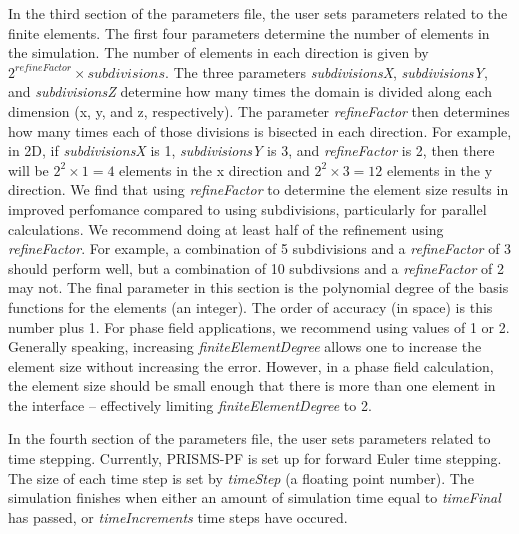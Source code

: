 \documentclass[10pt]{article} %
\begin{document}
In the third section of the parameters file, the user sets parameters related to the finite elements. The first four parameters determine the number of elements in the simulation. The number of elements in each direction is given by $2^{refineFactor} \times subdivisions$. The three parameters \emph{subdivisionsX}, \emph{subdivisionsY}, and \emph{subdivisionsZ} determine how many times the domain is divided along each dimension (x, y, and z, respectively). The parameter \emph{refineFactor} then determines how many times each of those divisions is bisected in each direction. For example, in 2D, if \emph{subdivisionsX} is 1, \emph{subdivisionsY} is 3, and \emph{refineFactor} is 2, then there will be $2^2 \times 1 =4$ elements in the x direction and $2^2 \times 3 =12$ elements in the y direction. We find that using \emph{refineFactor} to determine the element size results in improved perfomance compared to using subdivisions, particularly for parallel calculations. We recommend doing at least half of the refinement using \emph{refineFactor}. For example, a combination of 5 subdivisions and a \emph{refineFactor} of 3 should perform well, but a combination of 10 subdivsions and a  \emph{refineFactor} of 2 may not. The final parameter in this section is the polynomial degree of the basis functions for the elements (an integer). The order of accuracy (in space) is this number plus 1. For phase field applications, we recommend using values of 1 or 2. Generally speaking, increasing \emph{finiteElementDegree} allows one to increase the element size without increasing the error. However, in a phase field calculation, the element size should be small enough that there is more than one element in the interface -- effectively limiting \emph{finiteElementDegree} to 2.

In the fourth section of the parameters file, the user sets parameters related to time stepping. Currently, PRISMS-PF is set up for forward Euler time stepping. The size of each time step is set by \emph{timeStep} (a floating point number). The simulation finishes when either an amount of simulation time equal to \emph{timeFinal} has passed, or \emph{timeIncrements} time steps have occured.
\end{document}
